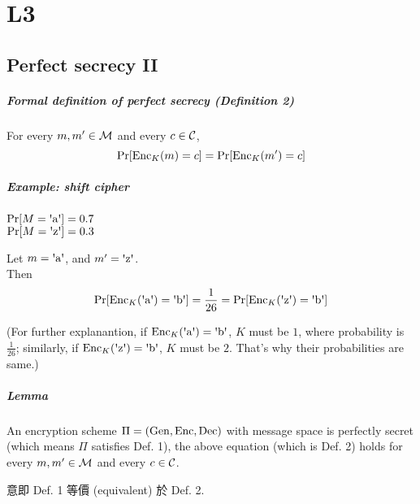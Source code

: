 \section{L3}


\subsection{Perfect secrecy II}

\subparagraph{Formal definition of perfect secrecy (\textbf{Definition 2})}

For every \(m, m' \in \operatorname{\mathcal{M}}\) and every \(c \in \operatorname{\mathcal{C}}\),
\[\Pr[\operatorname{Enc}_K(m) = c] = \Pr[\operatorname{Enc}_K(m') = c]\]

\subparagraph{Example: shift cipher}

\(\Pr[M = \letter{a}] = 0.7\) \\
\(\Pr[M = \letter{z}] = 0.3\)

Let \(m = \letter{a}\), and \(m' = \letter{z}\). \\
Then
\[ \Pr[\Enc_K(\letter{a}) = \letter{b}] = \frac{1}{26} =
\Pr[\Enc_K(\letter{z}) = \letter{b}] \]

(For further explanantion, if \(\Enc_K(\letter{a}) = \letter{b}\), \(K\) must be \(1\), where probability is \(\frac{1}{26}\); similarly, if \(\Enc_K(\letter{z}) = \letter{b}\), \(K\) must be \(2\). That's why their probabilities are same.)

\subparagraph{Lemma}

An encryption scheme \(\Pi = (\operatorname{Gen}, \operatorname{Enc}, \operatorname{Dec})\) with message space is perfectly secret (which means \(\Pi\) satisfies Def. 1), the above equation (which is Def. 2) holds for every \(m, m' \in \operatorname{\mathcal{M}}\) and every \(c \in \operatorname{\mathcal{C}}\).

意即 Def. 1 等價 (equivalent) 於 Def. 2.

\pagebreak

